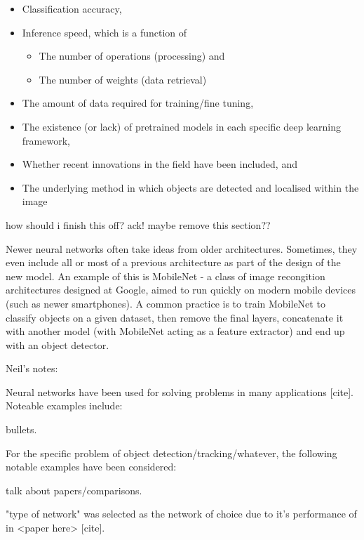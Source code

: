 \begin{itemize}
	\item Classification accuracy,
	\item Inference speed, which is a function of
	\begin{itemize}
		\item The number of operations (processing) and
		\item The number of weights (data retrieval)
	\end{itemize}
	\item The amount of data required for training/fine tuning,
	\item The existence (or lack) of pretrained models in each specific deep learning framework,
	\item Whether recent innovations in the field have been included, and
	\item The underlying method in which objects are detected and localised within the image
\end{itemize}

{\Huge \color{red} how should i finish this off? ack! maybe remove this section??}

Newer neural networks often take ideas from older architectures. Sometimes, they even include all or most of a previous architecture as part of the design of the new model. An example of this is MobileNet - a class of image recongition architectures designed at Google, aimed to run quickly on modern mobile devices (such as newer smartphones). A common practice is to train MobileNet to classify objects on a given dataset, then remove the final layers, concatenate it with another model (with MobileNet acting as a feature extractor) and end up with an object detector.




{\color{red}
Neil's notes:

Neural networks have been used for solving problems in many applications [cite]. Noteable examples include:

bullets.

For the specific problem of object detection/tracking/whatever, the following notable examples have been considered:

talk about papers/comparisons.

"type of network" was selected as the network of choice due to it's performance of  in <paper here> [cite].
}
